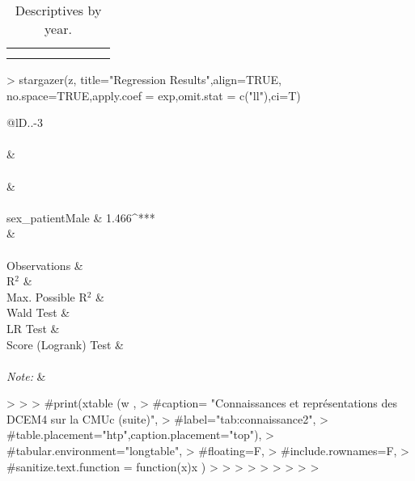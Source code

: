 \documentclass{article}
\begin{document}
\begin{Schunk}
\begin{small}
\begin{longtable}{lccccccc}
    \hline\\ \caption{Descriptives by year.}\\
    \end{longtable}\end{small} \begin{Sinput}
> stargazer(z, title="Regression Results",align=TRUE, no.space=TRUE,apply.coef = exp,omit.stat = c("ll"),ci=T)
\end{Sinput}
% Table created by stargazer v.5.2 by Marek Hlavac, Harvard University. E-mail: hlavac at fas.harvard.edu
% Date and time: mar., mai 16, 2017 - 12:24:54
% Requires LaTeX packages: dcolumn 
\begin{table}[!htbp] \centering 
  \caption{Regression Results} 
  \label{} 
\begin{tabular}{@{\extracolsep{5pt}}lD{.}{.}{-3} } 
\\[-1.8ex]\hline 
\hline \\[-1.8ex] 
 &  \\ 
\\[-1.8ex] &  \\ 
\hline \\[-1.8ex] 
 sex\_patientMale & 1.466^{***} \\ 
  &  \\ 
 \hline \\[-1.8ex] 
Observations &  \\ 
R$^{2}$ &  \\ 
Max. Possible R$^{2}$ &  \\ 
Wald Test &  \\ 
LR Test &  \\ 
Score (Logrank) Test &  \\ 
\hline 
\hline \\[-1.8ex] 
\textit{Note:}  &  \\ 
\end{tabular} 
\end{table} \begin{Sinput}
> 
> 
> #print(xtable (w ,
> #caption= "Connaissances et représentations des DCEM4 sur la CMUc (suite)",
> #label="tab:connaissance2",
> #table.placement="htp",caption.placement="top"),
> #tabular.environment="longtable",
> #floating=F,
> #include.rownames=F,
>  #sanitize.text.function = function(x){x}  )
> 
> 
> 
> 
> 
> 
> 
> 
> 
\end{Sinput}
\end{Schunk}
\end{document}
